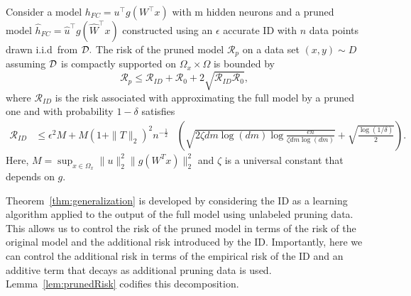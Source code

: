 \begin{theorem}
\label{thm:generalization}
Consider a model $h_{FC}=u^\top g(W^\top x)$ with m hidden neurons and a pruned model $\widehat{h}_{FC}=\widehat{u}^\top g(\widehat{W}^\top x)$ constructed using an $\epsilon$ accurate ID with $n$ data points drawn i.i.d\ from $\mathcal{D}.$ The risk of the pruned model $\mathcal{R}_p$ on a data set $(x,y) \sim D$ assuming $\mathcal{D}$ is compactly supported on $\Omega_x\times\Omega$ is bounded by  
\begin{equation}
\label{eq:RiskDcomp}
    \mathcal{R}_p \leq \mathcal{R}_{ID} + \mathcal{R}_0+ 2  \sqrt{ \mathcal{R}_{ID}  \mathcal{R}_0},
\end{equation}
where $\mathcal{R}_{ID}$ is the risk associated with approximating the full model by a pruned one and with probability $1-\delta$ satisfies
\begin{align*}
    {\mathcal{R}}_{ID} 
    &\leq 
    \epsilon^2M+M(1+\|T\|_2)^2n^{-\frac{1}{2}} 
    &\left( \sqrt{2\zeta dm \log (dm)\log\frac{en}{\zeta dm \log (dm)}}+ \sqrt{\frac{\log (1/\delta)}{2}}\right).
\end{align*} 
Here, $M = \sup_{x\in\Omega_x} \|u\|_2^2 \| g(W^T x)\|_2^2$ and $\zeta$ is a universal constant that depends on $g$. %


\end{theorem}
Theorem~\ref{thm:generalization} is developed by considering the ID as a learning algorithm applied to the output of the full model using unlabeled pruning data. This allows us to control the risk of the pruned model in terms of the risk of the original model and the additional risk introduced by the ID. Importantly, here we can control the additional risk in terms of the empirical risk of the ID and an additive term that decays as additional pruning data is used. Lemma~\ref{lem:prunedRisk} codifies this decomposition.



